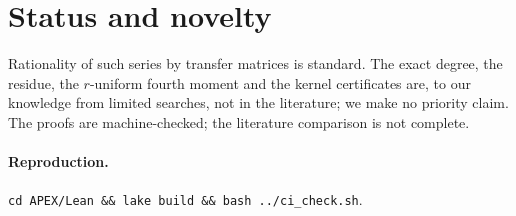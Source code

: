 \documentclass[11pt]{article}
\theoremstyle{remark}\newtheorem{remark}[theorem]{Remark}
\begin{document}
\section{Status and novelty}
Rationality of such series by transfer matrices is standard. The exact degree, the residue, the $r$-uniform fourth moment and the kernel certificates are, to our knowledge from limited searches, not in the literature; we make no priority claim. The proofs are machine-checked; the literature comparison is not complete.

\paragraph{Reproduction.} \texttt{cd APEX/Lean \&\& lake build \&\& bash ../ci\_check.sh}.
\end{document}
